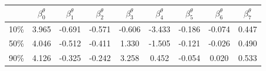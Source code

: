 \begin{tabular}{ccccccccc}
\hline
 & $\beta_0^{\theta}$ & $\beta_1^{\theta}$ & $\beta_2^{\theta}$ & $\beta_3^{\theta}$ & $\beta_4^{\theta}$ & $\beta_5^{\theta}$ & $\beta_6^{\theta}$ & $\beta_7^{\theta}$ \\
\hline
10\% & 3.965 & -0.691 & -0.571 & -0.606 & -3.433 & -0.186 & -0.074 & 0.447 \\
50\% & 4.046 & -0.512 & -0.411 & 1.330 & -1.505 & -0.121 & -0.026 & 0.490 \\
90\% & 4.126 & -0.325 & -0.242 & 3.258 & 0.452 & -0.054 & 0.020 & 0.533 \\
\hline
\end{tabular}